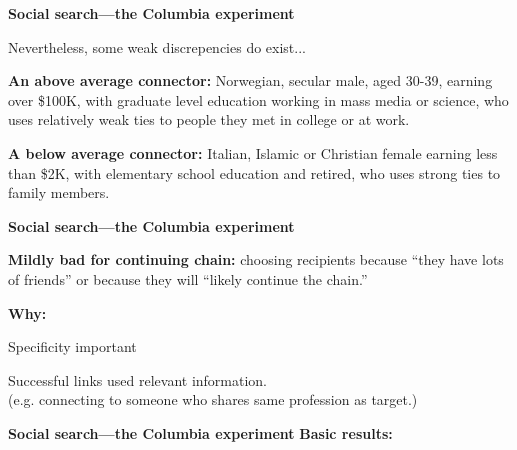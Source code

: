   \textbf{Social search---the Columbia experiment}






Nevertheless, some weak discrepencies do exist...

\textbf{An above average connector:}
  Norwegian, secular male, aged 30-39, earning over \$100K, 
  with graduate level education working in mass media or science,
  who uses relatively weak ties to people
  they met in college or at work.


\textbf{A below average connector:}
  Italian, Islamic or Christian female earning less than \$2K,
  with elementary school education and retired,
  who uses strong ties to family members.



  \textbf{Social search---the Columbia experiment}

  \textbf{Mildly bad for continuing chain:}
    choosing recipients because 
    \alert{``they have lots of friends''}
    or because they will 
    \alert{``likely continue the chain.''}
  

  \textbf{Why:}
    
     
      Specificity important
     
      Successful links used relevant information.\\
      (e.g. connecting to someone who shares same profession as target.)
    
  



%
%
%
  \textbf{Social search---the Columbia experiment}
  \textbf{Basic results:}
    
    
    
